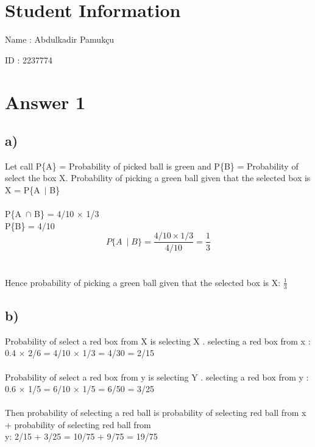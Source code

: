 \documentclass[12pt]{article}
\begin{document}
\section*{Student Information}

Name : Abdulkadir Pamukçu

ID : 2237774


\section*{Answer 1}
\subsection*{a)}
Let call P\{A\} = Probability of picked ball is green and P\{B\} = Probability of select the box X. Probability of picking a green ball given that the selected box is X = P\{A\ $\mid$ B\}\\
\\
P\{A\ $\cap$ B\} = 4/10 $\times$ 1/3\\
P\{B\} = 4/10\\
\[ P\{A\ \mid B\} = \frac{ 4/10 \times 1/3 }{4/10} = \frac{1}{3}   \]\\ 
\\
Hence probability of picking a green ball given that the selected box is X:
$\frac{1}{3}$

\subsection*{b)}
Probability of select a red box from X is selecting X . selecting a red box from x :\\
0.4 $\times$ 2/6 = 4/10 $\times$ 1/3 = 4/30 = 2/15 \\
\\
Probability of select a red box from y is selecting Y . selecting a red box from y :\\
0.6 $\times$ 1/5 = 6/10 $\times$ 1/5 = 6/50 = 3/25\\
\\
Then probability of selecting a red ball is probability of selecting red ball from x + probability of selecting red ball from\\
y: 2/15 + 3/25 = 10/75 + 9/75 = 19/75
\end{document}

